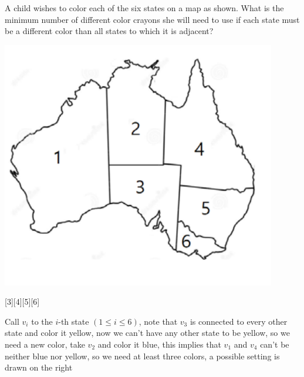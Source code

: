 \documentclass[12pt]{article}
\newcounter{problem}
\begin{document}
\begin{problem}
   \begin{minipage}[b][][b]{0.75\linewidth}\vspace{0pt}%
      A child wishes to color each of the six states on a map as shown. What is the minimum number of different color crayons she will need to use if each state must be a different color than all states to which it is adjacent?    
      \end{minipage}\hfill%
      \begin{minipage}[b][][b]{0.2\linewidth}%
        \includegraphics[width=0.9\textwidth]{map.png}
      \vspace{4.5mm}
      \end{minipage}\vspace{-5mm}
\end{problem}
[3][4][5][6]

\begin{solution}[B]
   Call $v_i$ to the $i$-th state $(1\leq i \leq 6)$, note that $v_3$ is connected to every other state and color it yellow, now we can't have any other state to be yellow, so we need a new color, take $v_2$ and color it blue, this implies that $v_1$ and $v_4$ can't be neither blue nor yellow, so we need at least three colors, a possible setting is drawn on the right
\end{solution}
\end{document}
